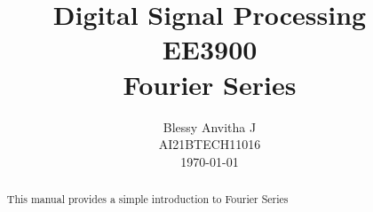 \documentclass[journal,12pt,twocolumn]{IEEEtran}
\begin{document}
	\def\rightbox#1{\makebox[0in][r]{#1}}
	\def\centbox#1{\makebox[0in]{#1}}
	\def\topbox#1{\raisebox{-\baselineskip}[0in][0in]{#1}}
	\def\midbox#1{\raisebox{-0.5\baselineskip}[0in][0in]{#1}}
\title{ Digital Signal Processing \\ \Large EE3900 \\ \vspace*{12pt} \textbf{Fourier Series}}
\author{Blessy Anvitha J\\ \normalsize AI21BTECH11016 \\ \vspace*{20pt} \normalsize \today}
 \maketitle 
 \tableofcontents
 \begin{abstract}
    This manual provides a simple introduction to Fourier Series
    \end{abstract}
\end{document}

